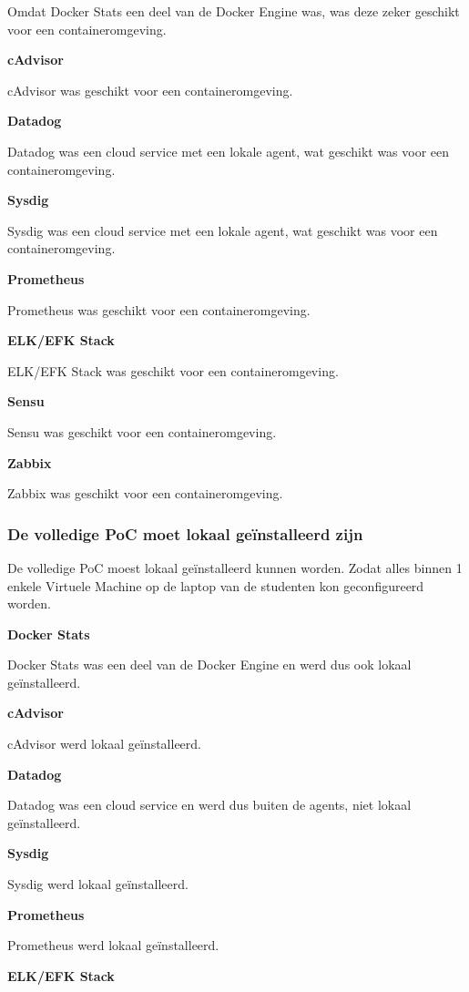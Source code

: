 Omdat Docker Stats een deel van de Docker Engine was, was deze zeker geschikt voor een containeromgeving.

\textbf{cAdvisor}

cAdvisor was geschikt voor een containeromgeving.

\textbf{Datadog}

Datadog was een cloud service met een lokale agent, wat geschikt was voor een containeromgeving.

\textbf{Sysdig}

Sysdig was een cloud service met een lokale agent, wat geschikt was voor een containeromgeving.

\textbf{Prometheus}

Prometheus was geschikt voor een containeromgeving.

\textbf{ELK/EFK Stack}

ELK/EFK Stack was geschikt voor een containeromgeving.

\textbf{Sensu}

Sensu was geschikt voor een containeromgeving.

\textbf{Zabbix}

Zabbix was geschikt voor een containeromgeving.

\subsubsection{De volledige PoC moet lokaal geïnstalleerd zijn}

De volledige PoC moest lokaal geïnstalleerd kunnen worden. Zodat alles binnen 1 enkele Virtuele Machine op de laptop van de studenten kon geconfigureerd worden.

\textbf{Docker Stats} 

Docker Stats was een deel van de Docker Engine en werd dus ook lokaal geïnstalleerd.

\textbf{cAdvisor}

cAdvisor werd lokaal geïnstalleerd.

\textbf{Datadog}

Datadog was een cloud service en werd dus buiten de agents, niet lokaal geïnstalleerd.

\textbf{Sysdig}

Sysdig werd lokaal geïnstalleerd.

\textbf{Prometheus}

Prometheus werd lokaal geïnstalleerd.

\textbf{ELK/EFK Stack}

